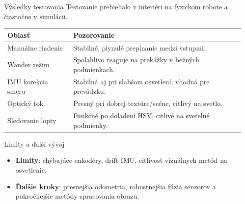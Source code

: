 \documentclass[final]{beamer}
\newcommand{\blocktopspace}{\vspace{0.45em}}
\newlength{\sepwidthB}
\newlength{\colwidthB}
\newcommand{\separatorcolumnB}{\begin{column}{\sepwidthB}\end{column}}
\begin{document}
\begin{frame}[t]
\begin{columns}[t]
\begin{column}[T]{\colwidthB}
    \begin{block}{Výsledky testovania}
    \blocktopspace
    Testovanie prebiehalo v interiéri na fyzickom robote a čiastočne v simulácii.
        \begin{table}
            \centering
                \begin{tabular}{@{}p{}p{}@{}}
                \toprule
                \textbf{Oblasť} & \textbf{Pozorovanie} \\
                \midrule
                Manuálne riadenie & Stabilné, plynulé prepínanie medzi vstupmi. \\
                Wander režim & Spoľahlivo reaguje na prekážky v bežných podmienkach. \\
                IMU korekcia smeru & Stabilná aj pri slabšom osvetlení, vhodná pre prevádzku. \\
                Optický tok & Presný pri dobrej textúre/scéne, citlivý na svetlo. \\
                Sledovanie lopty & Funkčné po doladení HSV, citlivé na svetelné podmienky. \\
                \bottomrule
            \end{tabular}
        \end{table}
    \end{block}

    \begin{block}{Limity a ďalší vývoj}
        \blocktopspace
        \begin{itemize}
            \item \textbf{Limity}: chýbajúce enkodéry, drift IMU, citlivosť vizuálnych metód na osvetlenie.
            \item \textbf{Ďalšie kroky}: presnejšia odometria, robustnejšia fúzia senzorov a pokročilejšie metódy spracovania obrazu.
        \end{itemize}
    \end{block}

\end{column}
\separatorcolumnB
\end{columns}
\end{frame}
\end{document}
